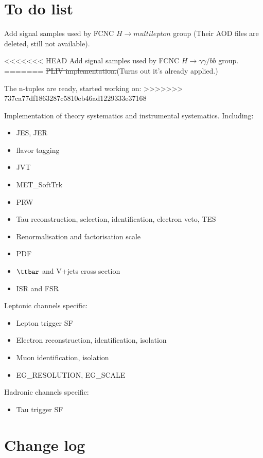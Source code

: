 \section{To do list}

Add signal samples used by FCNC $H\to multilepton$ group (Their AOD files are deleted, still not available).

<<<<<<< HEAD
Add signal samples used by FCNC $H\to \gamma\gamma/bb$ group.
=======
\sout{PLIV implementation.}(Turns out it's already applied.)

The n-tuples are ready, started working on:
>>>>>>> 737ca77df1863287c5810eb46ad1229333e37168

Implementation of theory systematics and instrumental systematics. Including:

\begin{itemize}
	\item JES, JER
	\item flavor tagging
	\item JVT
	\item MET\_SoftTrk
	\item PRW
	\item Tau reconstruction, selection, identification, electron veto, TES
	\item Renormalisation and factorisation scale
	\item PDF
	\item $\ttbar$ and V+jets cross section
	\item ISR and FSR
\end{itemize}

Leptonic channels specific:
\begin{itemize}
	\item Lepton trigger SF
	\item Electron reconstruction, identification, isolation
	\item Muon identification, isolation
	\item EG\_RESOLUTION, EG\_SCALE
\end{itemize}

Hadronic channels specific:
\begin{itemize}
	\item Tau trigger SF
\end{itemize}

\section{Change log}

